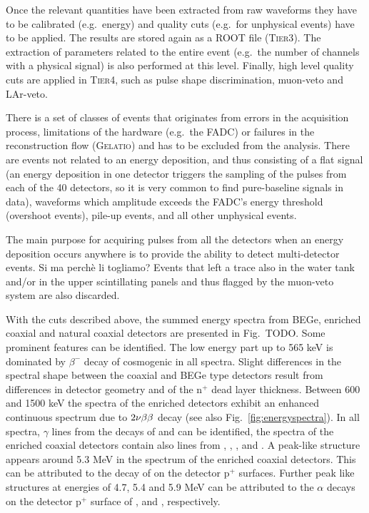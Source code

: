 Once the relevant quantities have been extracted from raw waveforms they have to be calibrated (e.g.~energy) and quality cuts (e.g.~for unphysical events) have to be applied. The results are stored again as a ROOT file (\textsc{Tier3}). The extraction of parameters related to the entire event (e.g.~the number of channels with a physical signal) is also performed at this level. Finally, high level quality cuts are applied in \textsc{Tier4}, such as pulse shape discrimination, muon-veto and LAr-veto.

 There is a set of classes of events that originates from errors in the acquisition process, limitations of the hardware (e.g.~the FADC) or failures in the reconstruction flow (\textsc{Gelatio}) and has to be excluded from the analysis. There are events not related to an energy deposition, and thus consisting of a flat signal (an energy deposition in one detector triggers the sampling of the pulses from each of the 40 detectors, so it is very common to find pure-baseline signals in data), waveforms which amplitude exceeds the FADC's energy threshold (overshoot events), pile-up events, and all other unphysical events.

The main purpose for acquiring pulses from all the detectors when an energy deposition occurs anywhere is to provide the ability to detect multi-detector events. {\color{red}Si ma perchè li togliamo?} Events that left a trace also in the water tank and/or in the upper scintillating panels and thus flagged by the muon-veto system are also discarded.

 With the cuts described above, the summed energy spectra from BEGe, enriched coaxial and natural coaxial detectors are presented in Fig.~TODO. Some prominent features can be identified. The low energy part up to 565 keV is dominated by $\beta^-$ decay of cosmogenic  in all spectra. Slight differences in the spectral shape between the coaxial and BEGe type detectors result from differences in detector geometry and of the n$^+$ dead layer thickness. Between 600 and 1500 keV the spectra of the enriched detectors exhibit an enhanced continuous spectrum due to $2\nu\beta\beta$ decay (see also Fig.~\ref{fig:energyspectra}). In all spectra, $\gamma$ lines from the decays of  and  can be identified, the spectra of the enriched coaxial detectors contain also lines from , , ,  and . A peak-like structure appears around 5.3 MeV in the spectrum of the enriched coaxial detectors. This can be attributed to the decay of  on the detector p$^+$ surfaces. Further peak like structures at energies of 4.7, 5.4 and 5.9 MeV can be attributed to the $\alpha$ decays on the detector p$^+$ surface of ,  and , respectively. 
